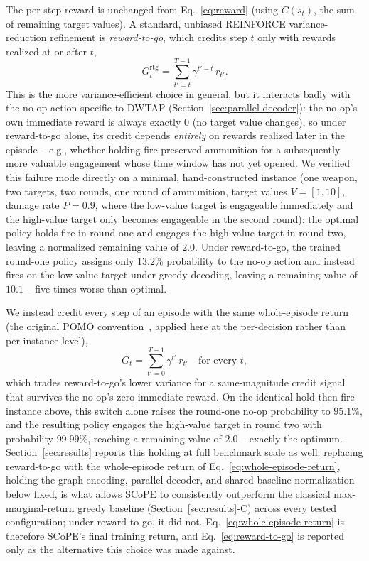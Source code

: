 \documentclass[smallcondensed]{svjour3}
\begin{document}
The per-step reward is unchanged from Eq.~\eqref{eq:reward} (using $C(s_t)$, the sum of remaining target values). A standard, unbiased REINFORCE variance-reduction refinement is \emph{reward-to-go}, which credits step $t$ only with rewards realized at or after $t$,
\begin{equation}
\label{eq:reward-to-go}
G_t^{\text{rtg}} = \sum_{t'=t}^{T-1} \gamma^{t'-t}\, r_{t'}.
\end{equation}
This is the more variance-efficient choice in general, but it interacts badly with the no-op action specific to DWTAP (Section~\ref{sec:parallel-decoder}): the no-op's own immediate reward is always exactly $0$ (no target value changes), so under reward-to-go alone, its credit depends \emph{entirely} on rewards realized later in the episode -- e.g., whether holding fire preserved ammunition for a subsequently more valuable engagement whose time window has not yet opened. We verified this failure mode directly on a minimal, hand-constructed instance (one weapon, two targets, two rounds, one round of ammunition, target values $V=[1,10]$, damage rate $P=0.9$, where the low-value target is engageable immediately and the high-value target only becomes engageable in the second round): the optimal policy holds fire in round one and engages the high-value target in round two, leaving a normalized remaining value of $2.0$. Under reward-to-go, the trained round-one policy assigns only $13.2\%$ probability to the no-op action and instead fires on the low-value target under greedy decoding, leaving a remaining value of $10.1$ -- five times worse than optimal.

We instead credit every step of an episode with the same whole-episode return (the original POMO convention~\cite{kwon2020pomo}, applied here at the per-decision rather than per-instance level),
\begin{equation}
\label{eq:whole-episode-return}
G_t = \sum_{t'=0}^{T-1} \gamma^{t'}\, r_{t'} \quad \text{for every } t,
\end{equation}
which trades reward-to-go's lower variance for a same-magnitude credit signal that survives the no-op's zero immediate reward. On the identical hold-then-fire instance above, this switch alone raises the round-one no-op probability to $95.1\%$, and the resulting policy engages the high-value target in round two with probability $99.99\%$, reaching a remaining value of $2.0$ -- exactly the optimum. Section~\ref{sec:results} reports this holding at full benchmark scale as well: replacing reward-to-go with the whole-episode return of Eq.~\eqref{eq:whole-episode-return}, holding the graph encoding, parallel decoder, and shared-baseline normalization below fixed, is what allows SCoPE to consistently outperform the classical max-marginal-return greedy baseline (Section~\ref{sec:results}-C) across every tested configuration; under reward-to-go, it did not. Eq.~\eqref{eq:whole-episode-return} is therefore SCoPE's final training return, and Eq.~\eqref{eq:reward-to-go} is reported only as the alternative this choice was made against.
\end{document}
